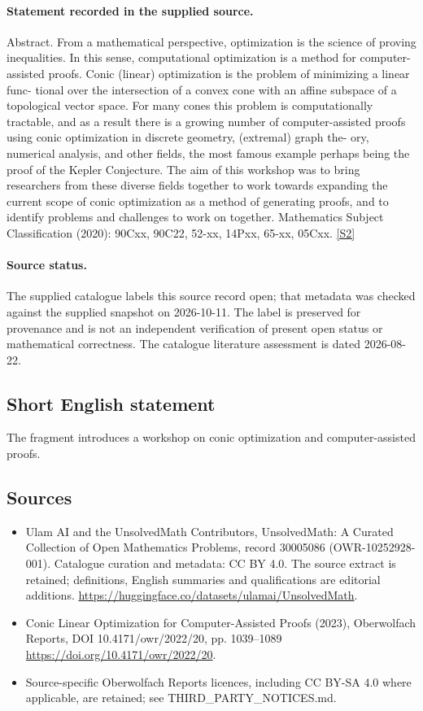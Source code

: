 \documentclass[11pt]{article}
\newcommand{\sref}[2]{\hyperlink{source:#1:#2}{[S#2]}}
\begin{document}
\paragraph{Statement recorded in the supplied source.}
Abstract. From a mathematical perspective, optimization is the science of proving inequalities. In this sense, computational optimization is a method for computer-assisted proofs. Conic (linear) optimization is the problem of minimizing a linear func- tional over the intersection of a convex cone with an affine subspace of a topological vector space. For many cones this problem is computationally tractable, and as a result there is a growing number of computer-assisted proofs using conic optimization in discrete geometry, (extremal) graph the- ory, numerical analysis, and other fields, the most famous example perhaps being the proof of the Kepler Conjecture. The aim of this workshop was to bring researchers from these diverse fields together to work towards expanding the current scope of conic optimization as a method of generating proofs, and to identify problems and challenges to work on together. Mathematics Subject Classification (2020): 90Cxx, 90C22, 52-xx, 14Pxx, 65-xx, 05Cxx. \sref{30005086}{2}
\paragraph{Source status.}
The supplied catalogue labels this source record open; that metadata was checked against the supplied snapshot on 2026-10-11. The label is preserved for provenance and is not an independent verification of present open status or mathematical correctness. The catalogue literature assessment is dated 2026-08-22.
\subsection{Short English statement}
The fragment introduces a workshop on conic optimization and computer-assisted proofs.
\subsection{Sources}
\begin{itemize}
\item[\hypertarget{source:30005086:1}{S1}] Ulam AI and the UnsolvedMath Contributors, UnsolvedMath: A Curated Collection of Open Mathematics Problems, record 30005086 (OWR-10252928-001). Catalogue curation and metadata: CC BY 4.0. The source extract is retained; definitions, English summaries and qualifications are editorial additions.
\url{https://huggingface.co/datasets/ulamai/UnsolvedMath}.
\item[\hypertarget{source:30005086:2}{S2}] Conic Linear Optimization for Computer-Assisted Proofs (2023), Oberwolfach Reports, DOI 10.4171/owr/2022/20, pp. 1039--1089
\url{https://doi.org/10.4171/owr/2022/20}.
\item Source-specific Oberwolfach Reports licences, including CC BY-SA 4.0 where applicable, are retained; see THIRD\_PARTY\_NOTICES.md.
\end{itemize}
\end{document}
